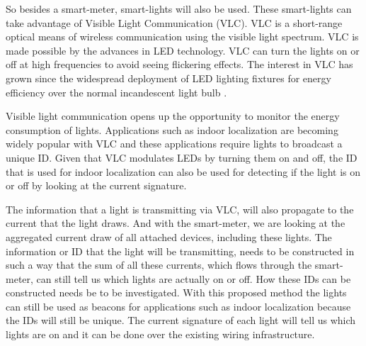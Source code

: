 	So besides a smart-meter, smart-lights will also be used.
	These smart-lights can take advantage of Visible Light Communication (VLC).
	VLC is a short-range optical means of wireless communication using the visible light spectrum.
	VLC is made possible by the advances in LED technology.
	VLC can turn the lights on or off at high frequencies to avoid seeing flickering effects.
	The interest in VLC has grown since the widespread deployment of LED lighting fixtures for energy efficiency over the normal incandescent light bulb \cite{rajagopal2012ieee}.


	Visible light communication opens up the opportunity to monitor the energy consumption of lights. Applications such as indoor localization are becoming widely popular with VLC and these applications require lights to broadcast a unique ID. 
	Given that VLC modulates LEDs by turning them on and off, the ID that is used for indoor localization can also be used for detecting if the light is on or off by looking at the current signature.


	The information that a light is transmitting via VLC, will also propagate to the current that the light draws.
	And with the smart-meter, we are looking at the aggregated current draw of all attached devices, including these lights.
	The information or ID that the light will be transmitting, needs to be constructed in such a way that the sum of all these currents, which flows through the smart-meter, can still tell us which lights are actually on or off.
	How these IDs can be constructed needs be to be investigated.
	With this proposed method the lights can still be used as beacons for applications such as indoor localization because the IDs will still be unique.
	The current signature of each light will tell us which lights are on and it can be done over the existing wiring infrastructure.

